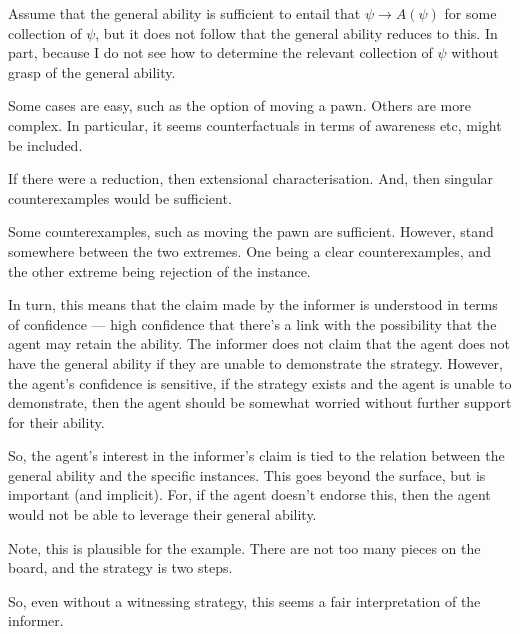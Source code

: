 \documentclass[10pt]{article}
\begin{document}
\begin{note}[GandS]
Assume that the general ability is sufficient to entail that \(\psi \rightarrow A(\psi)\) for some collection of \(\psi\), but it does not follow that the general ability reduces to this.
  In part, because I do not see how to determine the relevant collection of \(\psi\) without grasp of the general ability.

  Some cases are easy, such as the option of moving a pawn.
  Others are more complex.
  In particular, it seems counterfactuals in terms of awareness etc, might be included.

  If there were a reduction, then extensional characterisation.
  And, then singular counterexamples would be sufficient.

  Some counterexamples, such as moving the pawn are sufficient.
  However, stand somewhere between the two extremes.
  One being a clear counterexamples, and the other extreme being rejection of the instance.

  In turn, this means that the claim made by the informer is understood in terms of confidence --- high confidence that there's a link with the possibility that the agent may retain the ability.
  The informer does not claim that the agent does not have the general ability if they are unable to demonstrate the strategy.
  However, the agent's confidence is sensitive, if the strategy exists and the agent is unable to demonstrate, then the agent should be somewhat worried without further support for their ability.

  So, the agent's interest in the informer's claim is tied to the relation between the general ability and the specific instances.
  This goes beyond the surface, but is important (and implicit).
  For, if the agent doesn't endorse this, then the agent would not be able to leverage their general ability.

  Note, this is plausible for the example.
  There are not too many pieces on the board, and the strategy is two steps.

  So, even without a witnessing strategy, this seems a fair interpretation of the informer.
\end{note}
\end{document}
